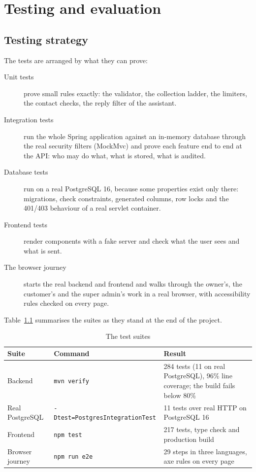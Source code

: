 \chapter{Testing and evaluation}
\label{ch:test}

\section{Testing strategy}

The tests are arranged by what they can prove:
\begin{description}
	\item[Unit tests] prove small rules exactly: the validator, the collection ladder, the limiters, the contact checks,
	the reply filter of the assistant.
	\item[Integration tests] run the whole Spring application against an in-memory database through the real security
	filters (MockMvc) and prove each feature end to end at the API: who may do what, what is stored, what is audited.
	\item[Database tests] run on a real PostgreSQL 16, because some properties exist only there: migrations, check
	constraints, generated columns, row locks and the 401/403 behaviour of a real servlet container.
	\item[Frontend tests] render components with a fake server and check what the user sees and what is sent.
	\item[The browser journey] starts the real backend and frontend and walks through the owner's, the customer's and
	the super admin's work in a real browser, with accessibility rules checked on every page.
\end{description}

Table~\ref{tab:tests} summarises the suites as they stand at the end of the project.

\begin{table}[!htbp]
	\centering
	\begin{tabularx}{\textwidth}{l l X}
		\toprule
		\textbf{Suite} & \textbf{Command} & \textbf{Result} \\
		\midrule
		Backend & \texttt{mvn verify} & 284 tests (11 on real PostgreSQL), 96\% line coverage; the build fails below 80\% \\
		Real PostgreSQL & \texttt{-Dtest=PostgresIntegrationTest} & 11 tests over real HTTP on PostgreSQL 16 \\
		Frontend & \texttt{npm test} & 217 tests, type check and production build \\
		Browser journey & \texttt{npm run e2e} & 29 steps in three languages, axe rules on every page \\
		\bottomrule
	\end{tabularx}
	\caption{The test suites}
	\label{tab:tests}
\end{table}

